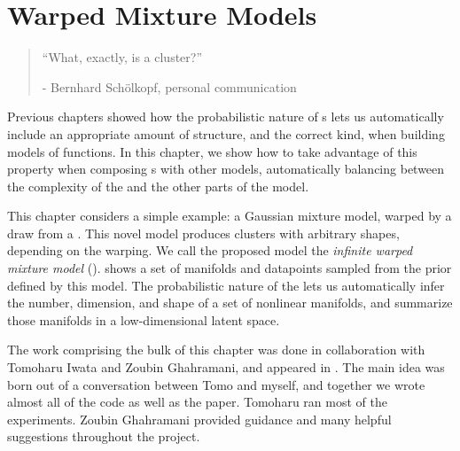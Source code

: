 
\inbpdocument

\chapter{Warped Mixture Models}  %
\label{ch:warped}

\begin{quotation}
``What, exactly, is a cluster?''

\hspace*{\fill} - Bernhard Sch\"{o}lkopf, personal communication
\end{quotation}

Previous chapters showed how the probabilistic nature of \gp{}s lets us automatically include an appropriate amount of structure, and the correct kind, when building models of functions.
In this chapter, we show how to take advantage of this property when composing \gp{}s with other models,
automatically balancing between the complexity of the \gp{} and the other parts of the model.

This chapter considers a simple example: a Gaussian mixture model, warped by a draw from a \gp{}.
This novel model produces clusters with arbitrary shapes, depending on the warping.
We call the proposed model the \emph{infinite warped mixture model} (\iwmm{}).
 shows a set of manifolds and datapoints sampled from the prior defined by this model.
The probabilistic nature of the \iwmm{} lets us automatically infer the number, dimension, and shape of a set of nonlinear manifolds, and summarize those manifolds in a low-dimensional latent space.





The work comprising the bulk of this chapter was done in collaboration with Tomoharu Iwata and Zoubin Ghahramani, and appeared in \citet{IwaDuvGha12}.
The main idea was born out of a conversation between Tomo and myself, and together we wrote almost all of the code as well as the paper.
Tomoharu ran most of the experiments.
Zoubin Ghahramani provided guidance and many helpful suggestions throughout the project.


